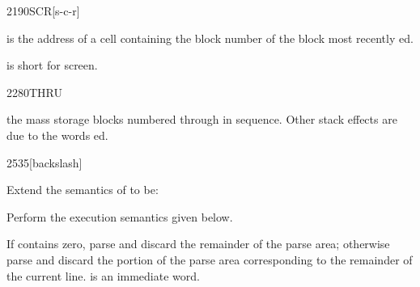 \begin{worddef}{2190}{SCR}[s-c-r]
\item {}

	 is the address of a cell containing the block
	number of the block most recently ed.

	\begin{rationale} %
		 is short for screen.
	\end{rationale}
\end{worddef}

\begin{worddef}{2280}{THRU}
\item {}

	 the mass storage blocks numbered  through
	 in sequence. Other stack effects are due to the words
	ed.
\end{worddef}

\vspace*{-3ex}
\begin{worddef}[bs]{2535}{\bs}[backslash]
\item Extend the semantics of  to be:

\compile
	Perform the execution semantics given below.

\execute

	If  contains zero, parse and discard the remainder
	of the parse area; otherwise parse and discard the portion
	of the parse area corresponding to the remainder of the current
	line.  is an immediate word.
\end{worddef}
